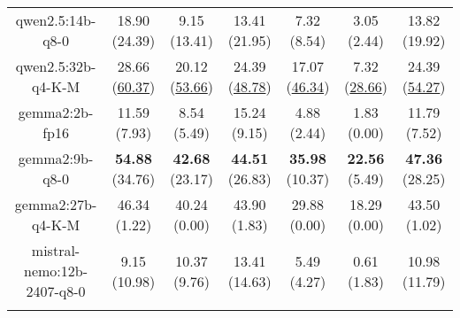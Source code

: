 \begin{table}[hbp]
{\begin{tabular}{ccccccc}
        \multicolumn{1}{c|}{qwen2.5:14b-q8-0} & 18.90 (24.39) & 9.15 (13.41) & \multicolumn{1}{c|}{13.41 (21.95)} & 7.32 (8.54) & \multicolumn{1}{c|}{3.05 (2.44)} & 13.82 (19.92) \\
        

        \multicolumn{1}{c|}{qwen2.5:32b-q4-K-M} & 28.66 (\underline{60.37}) & 20.12 (\underline{53.66}) & \multicolumn{1}{c|}{24.39 (\underline{48.78})} & 17.07 (\underline{46.34}) & \multicolumn{1}{c|}{7.32 (\underline{28.66})} & 24.39 (\underline{54.27}) \\
        

        \multicolumn{1}{c|}{gemma2:2b-fp16} & 11.59 (7.93) & 8.54 (5.49) & \multicolumn{1}{c|}{15.24 (9.15)} & 4.88 (2.44) & \multicolumn{1}{c|}{1.83 (0.00)} & 11.79 (7.52) \\
        

        \multicolumn{1}{c|}{gemma2:9b-q8-0} & \textbf{54.88} (34.76) & \textbf{42.68} (23.17) & \multicolumn{1}{c|}{\textbf{44.51} (26.83)} & \textbf{35.98} (10.37) & \multicolumn{1}{c|}{\textbf{22.56} (5.49)} & \textbf{47.36} (28.25) \\
        

        \multicolumn{1}{c|}{gemma2:27b-q4-K-M} & 46.34 (1.22) & 40.24 (0.00) & \multicolumn{1}{c|}{43.90 (1.83)} & 29.88 (0.00) & \multicolumn{1}{c|}{18.29 (0.00)} & 43.50 (1.02) \\
        

        \multicolumn{1}{c|}{mistral-nemo:12b-2407-q8-0} & 9.15 (10.98) & 10.37 (9.76) & \multicolumn{1}{c|}{13.41 (14.63)} & 5.49 (4.27) & \multicolumn{1}{c|}{0.61 (1.83)} & 10.98 (11.79) \\
        
\\ \hline
\end{tabular}%
}
\end{table}
    
